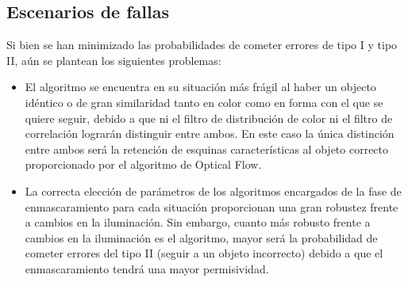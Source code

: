 \subsection{Escenarios de fallas}
Si bien se han minimizado las probabilidades de cometer errores de tipo I y tipo II, aún se plantean los siguientes problemas:
\begin{itemize}
\item El algoritmo se encuentra en su situación más frágil al haber un objecto idéntico o de gran similaridad tanto en color como en forma con el que se quiere seguir, debido a que ni el filtro de distribución de color ni el filtro de correlación lograrán distinguir entre ambos. En este caso la única distinción entre ambos será la retención de esquinas características al objeto correcto proporcionado por el algoritmo de Optical Flow. 
\item La correcta elección de parámetros de los algoritmos encargados de la fase de enmascaramiento para cada situación proporcionan una gran robustez frente a cambios en la iluminación. Sin embargo, cuanto más robusto frente a cambios en la iluminación es el algoritmo, mayor será la probabilidad de cometer errores del tipo II (seguir a un objeto incorrecto) debido a que el enmascaramiento tendrá una mayor permisividad. 
\end{itemize}



